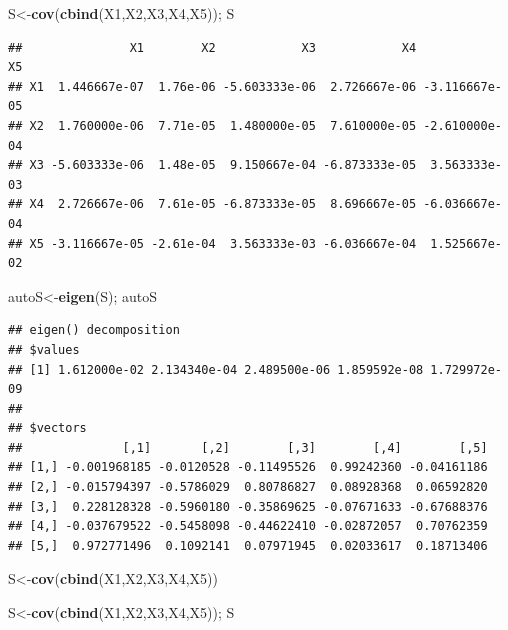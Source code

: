 \documentclass[
]{book}
\newenvironment{Shaded}{\begin{snugshade}}{\end{snugshade}}
\newcommand{\KeywordTok}[1]{\textcolor[rgb]{0.13,0.29,0.53}{\textbf{#1}}}
\newcommand{\NormalTok}[1]{#1}
\begin{document}
\begin{Shaded}
\begin{Highlighting}[]
\NormalTok{S<-}\KeywordTok{cov}\NormalTok{(}\KeywordTok{cbind}\NormalTok{(X1,X2,X3,X4,X5)); }
\NormalTok{S}
\end{Highlighting}
\end{Shaded}

\begin{verbatim}
##               X1        X2            X3            X4            X5
## X1  1.446667e-07  1.76e-06 -5.603333e-06  2.726667e-06 -3.116667e-05
## X2  1.760000e-06  7.71e-05  1.480000e-05  7.610000e-05 -2.610000e-04
## X3 -5.603333e-06  1.48e-05  9.150667e-04 -6.873333e-05  3.563333e-03
## X4  2.726667e-06  7.61e-05 -6.873333e-05  8.696667e-05 -6.036667e-04
## X5 -3.116667e-05 -2.61e-04  3.563333e-03 -6.036667e-04  1.525667e-02
\end{verbatim}

\begin{Shaded}
\begin{Highlighting}[]
\NormalTok{autoS<-}\KeywordTok{eigen}\NormalTok{(S); }
\NormalTok{autoS}
\end{Highlighting}
\end{Shaded}

\begin{verbatim}
## eigen() decomposition
## $values
## [1] 1.612000e-02 2.134340e-04 2.489500e-06 1.859592e-08 1.729972e-09
## 
## $vectors
##              [,1]       [,2]        [,3]        [,4]        [,5]
## [1,] -0.001968185 -0.0120528 -0.11495526  0.99242360 -0.04161186
## [2,] -0.015794397 -0.5786029  0.80786827  0.08928368  0.06592820
## [3,]  0.228128328 -0.5960180 -0.35869625 -0.07671633 -0.67688376
## [4,] -0.037679522 -0.5458098 -0.44622410 -0.02872057  0.70762359
## [5,]  0.972771496  0.1092141  0.07971945  0.02033617  0.18713406
\end{verbatim}

\begin{Shaded}
\begin{Highlighting}[]
\NormalTok{S<-}\KeywordTok{cov}\NormalTok{(}\KeywordTok{cbind}\NormalTok{(X1,X2,X3,X4,X5))}
\end{Highlighting}
\end{Shaded}

\begin{Shaded}
\begin{Highlighting}[]
\NormalTok{S<-}\KeywordTok{cov}\NormalTok{(}\KeywordTok{cbind}\NormalTok{(X1,X2,X3,X4,X5)); }
\NormalTok{S}
\end{Highlighting}
\end{Shaded}
\end{document}
